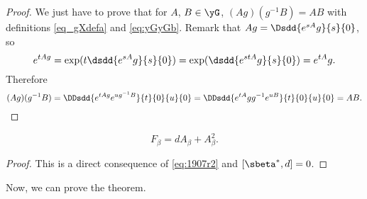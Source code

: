 \begin{proof}
We just have to prove that for $A$, $B\in\yG$, $(Ag)(g^{-1} B)=AB$ with definitions \eqref{eq_gXdefa} and \eqref{eq:yGyGb}. Remark that $Ag=\Dsdd{e^{sA}g}{s}{0}$, so
\[
  e^{tAg}=\exp(t\dsdd{e^{sA}g}{s}{0})=\exp(\dsdd{e^{stA}g}{s}{0})=e^{tA}g.
\]
Therefore
\[
  (Ag)(g^{-1} B)=\DDsdd{  e^{tAg}e^{ug^{-1} B}  }{t}{0}{u}{0}=\DDsdd{  e^{tA}gg^{-1} e^{uB}  }{t}{0}{u}{0}=AB.
\]
\end{proof}

\begin{lemma}
\begin{equation}
    F_{\beta}=dA_{\beta}+A_{\beta}^2.
\end{equation}
\end{lemma}

\begin{proof}
This is  a direct consequence of \eqref{eq:1907r2} and $[\sbeta^*,d]=0$.
\end{proof}
Now, we can prove the theorem.

